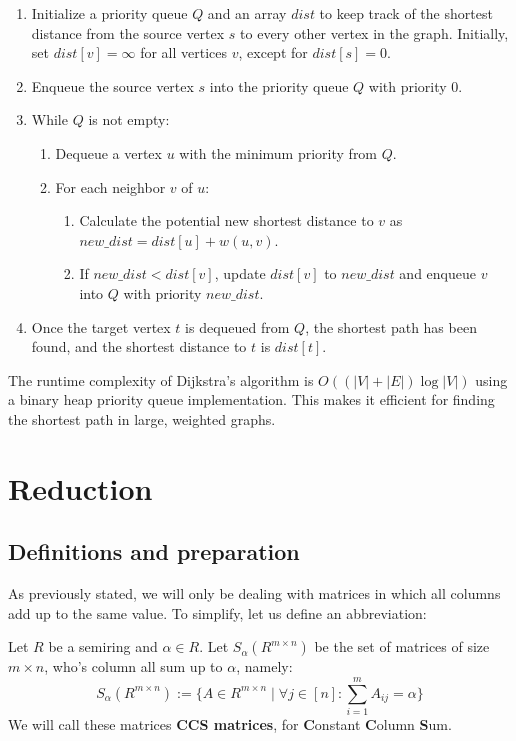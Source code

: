 \begin{enumerate}
    \item Initialize a priority queue $Q$ and an array $dist$ to keep track of the shortest distance from the source vertex $s$ to every other vertex in the graph. Initially, set $dist[v] = \infty$ for all vertices $v$, except for $dist[s] = 0$.
    \item Enqueue the source vertex $s$ into the priority queue $Q$ with priority $0$.
    \item While $Q$ is not empty:
    \begin{enumerate}
        \item Dequeue a vertex $u$ with the minimum priority from $Q$.
        \item For each neighbor $v$ of $u$:
        \begin{enumerate}
            \item Calculate the potential new shortest distance to $v$ as $new\_dist = dist[u] + w(u, v)$.
            \item If $new\_dist < dist[v]$, update $dist[v]$ to $new\_dist$ and enqueue $v$ into $Q$ with priority $new\_dist$.
        \end{enumerate}
    \end{enumerate}
    \item Once the target vertex $t$ is dequeued from $Q$, the shortest path has been found, and the shortest distance to $t$ is $dist[t]$.
\end{enumerate}

The runtime complexity of Dijkstra's algorithm is $O((|V| + |E|) \log |V|)$ using a binary heap priority queue implementation. This makes it efficient for finding the shortest path in large, weighted graphs.


\section{Reduction}
\subsection{Definitions and preparation}
As previously stated, we will only be dealing with matrices in which all columns add up to the same value. To simplify, let us define an abbreviation:

\begin{definition}
    \label{def:CCS}
    Let $R$ be a semiring and $\alpha \in R$. Let $S_{\alpha}(R^{m \times n})$ be the set of matrices of size $m \times n$, who's column all sum up to $\alpha$, namely:
    $$S_{\alpha}(R^{m \times n}) := \{A \in R^{m \times n}\mid \forall j \in [n]\colon \sum_{i=1}^{m} A_{ij} = \alpha\}$$
    We will call these matrices \textbf{CCS matrices}, for \textbf{C}onstant \textbf{C}olumn \textbf{S}um.
\end{definition}

